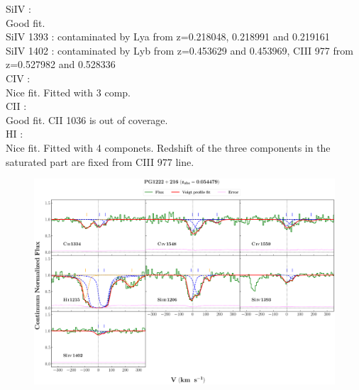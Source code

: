 \documentclass[12pt,draft]{report}
\begin{document}
SiIV :  \\  \hspace*{1.5cm}
        Good fit.  \\
        SiIV 1393  : contaminated by Lya from z=0.218048, 0.218991 and 0.219161 \\ 
        SiIV 1402  : contaminated by Lyb from z=0.453629 and 0.453969, CIII 977 from z=0.527982 and 0.528336  \\ 

CIV :  \\  \hspace*{1.5cm}
        Nice fit. Fitted with 3 comp.  \\ 

CII :  \\  \hspace*{1.5cm}
        Good fit. CII 1036 is out of coverage.  \\ 

HI :  \\  \hspace*{1.5cm}
        Nice fit. Fitted with 4 componets. Redshift of the three components in the saturated part are fixed from CIII 977 line.  \\ 


\newpage

\begin{landscape}

\begin{figure}
    \centering
    \vspace{-20mm}
    \hspace*{-35mm}
    \includegraphics[width=1.25\linewidth]{System-Plots/PG1222+216_z=0.054479_sys_plot.png}
\end{figure}

\end{landscape}
\end{document}
